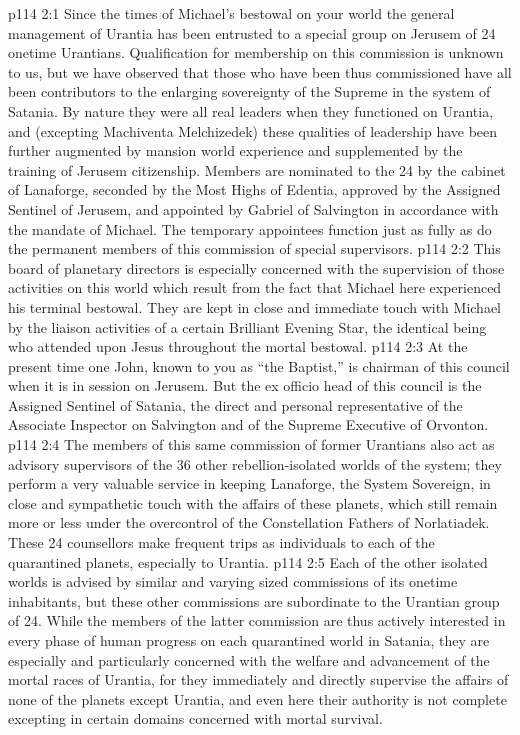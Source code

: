 \vs p114 2:1 Since the times of Michael’s bestowal on your world the general management of Urantia has been entrusted to a special group on Jerusem of 24 onetime Urantians. Qualification for membership on this commission is unknown to us, but we have observed that those who have been thus commissioned have all been contributors to the enlarging sovereignty of the Supreme in the system of Satania. By nature they were all real leaders when they functioned on Urantia, and (excepting Machiventa Melchizedek) these qualities of leadership have been further augmented by mansion world experience and supplemented by the training of Jerusem citizenship. Members are nominated to the 24 by the cabinet of Lanaforge, seconded by the Most Highs of Edentia, approved by the Assigned Sentinel of Jerusem, and appointed by Gabriel of Salvington in accordance with the mandate of Michael. The temporary appointees function just as fully as do the permanent members of this commission of special supervisors.
\vs p114 2:2 This board of planetary directors is especially concerned with the supervision of those activities on this world which result from the fact that Michael here experienced his terminal bestowal. They are kept in close and immediate touch with Michael by the liaison activities of a certain Brilliant Evening Star, the identical being who attended upon Jesus throughout the mortal bestowal.
\vs p114 2:3 At the present time one John, known to you as “the Baptist,” is chairman of this council when it is in session on Jerusem. But the ex officio head of this council is the Assigned Sentinel of Satania, the direct and personal representative of the Associate Inspector on Salvington and of the Supreme Executive of Orvonton.
\vs p114 2:4 The members of this same commission of former Urantians also act as advisory supervisors of the 36 other rebellion\hyp{}isolated worlds of the system; they perform a very valuable service in keeping Lanaforge, the System Sovereign, in close and sympathetic touch with the affairs of these planets, which still remain more or less under the overcontrol of the Constellation Fathers of Norlatiadek. These 24 counsellors make frequent trips as individuals to each of the quarantined planets, especially to Urantia.
\vs p114 2:5 Each of the other isolated worlds is advised by similar and varying sized commissions of its onetime inhabitants, but these other commissions are subordinate to the Urantian group of 24. While the members of the latter commission are thus actively interested in every phase of human progress on each quarantined world in Satania, they are especially and particularly concerned with the welfare and advancement of the mortal races of Urantia, for they immediately and directly supervise the affairs of none of the planets except Urantia, and even here their authority is not complete excepting in certain domains concerned with mortal survival.
